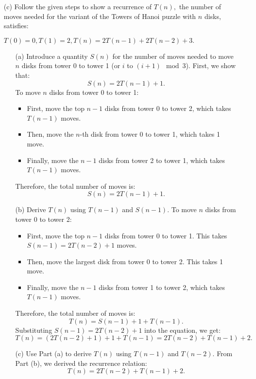 \documentclass[12pt]{article}
\begin{document}
\begin{itemize}
\begin{proof}
\begin{itemize}
        Therefore, the puzzle with $k+1$ disks can be solved in a finite number of moves.
        
        \item \textbf{Conclusion:} \\
        By the principle of mathematical induction, $P(n)$ is true for all $n \geq 1$. Thus, this variant of the Towers of Hanoi puzzle can be solved with finitely many legal moves for any number of disks.
    \end{itemize}

\end{proof}

\newpage
 \item[(c)] Follow the given steps to show a recurrence of $T(n),$ the  number of moves needed for the variant of the Towers of Hanoi puzzle with $n$ disks, satisfies:

$T(0)= 0, T(1)=2, T(n) = 2T(n-1)+ 2T(n-2)+3.$ 

\begin{itemize}
    \item[(a)] Introduce a quantity $S(n)$ for the number of moves needed to move $n$ disks from tower 0 to tower 1 (or $i$ to $(i+1) \mod 3$). First, we show that:
    \[
    S(n) = 2T(n-1) + 1.
    \]
    To move $n$ disks from tower 0 to tower 1:
    \begin{itemize}
        \item First, move the top $n-1$ disks from tower 0 to tower 2, which takes $T(n-1)$ moves.
        \item Then, move the $n$-th disk from tower 0 to tower 1, which takes 1 move.
        \item Finally, move the $n-1$ disks from tower 2 to tower 1, which takes $T(n-1)$ moves.
    \end{itemize}
    Therefore, the total number of moves is:
    \[
    S(n) = 2T(n-1) + 1.
    \]
    
    \item[(b)] Derive $T(n)$ using $T(n-1)$ and $S(n-1)$.
    To move $n$ disks from tower 0 to tower 2:
    \begin{itemize}
        \item First, move the top $n-1$ disks from tower 0 to tower 1. This takes $S(n-1) = 2T(n-2) + 1$ moves.
        \item Then, move the largest disk from tower 0 to tower 2. This takes 1 move.
        \item Finally, move the $n-1$ disks from tower 1 to tower 2, which takes $T(n-1)$ moves.
    \end{itemize}
    Therefore, the total number of moves is:
    \[
    T(n) = S(n-1) + 1 + T(n-1).
    \]
    Substituting $S(n-1) = 2T(n-2) + 1$ into the equation, we get:
    \[
    T(n) = (2T(n-2) + 1) + 1 + T(n-1) = 2T(n-2) + T(n-1) + 2.
    \]
    
    \item[(c)] Use Part (a) to derive $T(n)$ using $T(n-1)$ and $T(n-2)$.
    From Part (b), we derived the recurrence relation:
    \[
    T(n) = 2T(n-2) + T(n-1) + 2.
    \]
\end{itemize}


\end{itemize}
\end{document}
